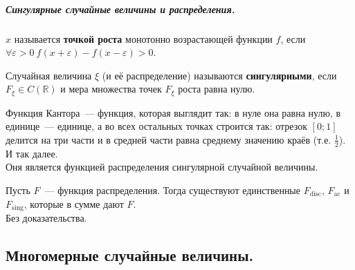 \documentclass{article}
\let\eps\varepsilon
\begin{document}
    \subparagraph{Сингулярные случайные величины и распределения.}
    \begin{definition}
        $x$ называется \textbf{точкой роста} монотонно возрастающей функции $f$, если $\forall\eps>0~f(x+\eps)-f(x-\eps)>0$.
    \end{definition}
    \begin{definition}
        Случайная величина $\xi$ (и её распределение) называются \textbf{сингулярными}, если $F_\xi\in C(\mathbb R)$ и мера множества точек $F_\xi$ роста равна нулю.
    \end{definition}
    \begin{example}
        Функция Кантора~--- функция, которая выглядит так: в нуле она равна нулю, в единице~--- единице, а во всех остальных точках строится так: отрезок $[0;1]$ делится на три части и в средней части равна среднему значению краёв (т.е. $\frac12$). И так далее.\\
        Оня является функцией распределения сингулярной случайной величины.
    \end{example}
    \begin{theorem}
        Пусть $F$~--- функция распределения. Тогда существуют единственные $F_{\mathrm{disc}}$, $F_{\mathrm{ac}}$ и $F_{\mathrm{sing}}$, которые в сумме дают $F$.\\
        Без доказательства.
    \end{theorem}
    \subsection{Многомерные случайные величины.}
\end{document}
